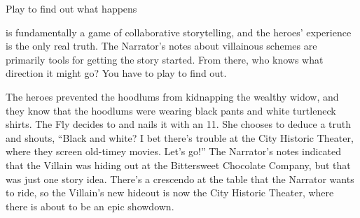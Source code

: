 \begin{principle}{Play to find out what happens}
{
\kapow{} is fundamentally a game of collaborative storytelling,
and the heroes' experience is the only real truth.
The Narrator's notes about villainous schemes are primarily tools
for getting the story started. From there, who knows what direction
it might go? You have to play to find out.

\begin{example}
  The heroes prevented the hoodlums from kidnapping the wealthy widow,
  and they know that the hoodlums were wearing black pants and white
  turtleneck shirts.  The Fly decides to  and nails
  it with an 11.  She chooses to deduce a truth and shouts, ``Black
  and white? I bet there's trouble at the City Historic Theater, where
  they screen old-timey movies. Let's go!''
  The Narrator's notes indicated that the Villain was hiding out
  at the Bittersweet Chocolate Company,
  but that was just one story idea.
  There's a crescendo at the table that the Narrator wants to ride,
  so the Villain's new hideout is now the City Historic Theater,
  where there is about to be an epic showdown.
\end{example}
}
\end{principle}

